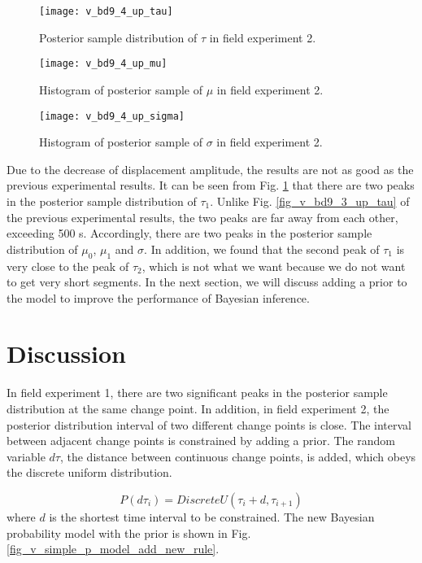 \documentclass[journal]{IEEEtran}
\begin{document}
\begin{figure}[htbp]
	\centering
	\texttt{[image: v\_bd9\_4\_up\_tau]}
	\caption{Posterior sample distribution of $\tau$ in field experiment 2.}
	\label{fig_v_bd9_4_up_tau}
\end{figure} 
\begin{figure}[htbp]
	\centering
	\texttt{[image: v\_bd9\_4\_up\_mu]}
	\caption{Histogram of posterior sample of $\mu$ in field experiment 2.}
	\label{fig_v_bd9_4_up_mu}
\end{figure} 
\begin{figure}[htbp]
	\centering
	\texttt{[image: v\_bd9\_4\_up\_sigma]}
	\caption{Histogram of posterior sample of $\sigma$ in field experiment 2.}
	\label{fig_v_bd9_4_up_sigma}
\end{figure}
Due to the decrease of displacement amplitude, the results are not as good as the previous experimental results. 
It can be seen from Fig. \ref{fig_v_bd9_4_up_tau} that there are two peaks in the posterior sample distribution of $\tau_1$. Unlike Fig. \ref{fig_v_bd9_3_up_tau} of the previous experimental results, the two peaks are far away from each other, exceeding 500 s. 
Accordingly, there are two peaks in the posterior sample distribution of $\mu_0$, $\mu_1$ and $\sigma$. 
In addition, we found that the second peak of $\tau_1$ is very close to the peak of $\tau_2$, which is not what we want because we do not want to get very short segments. 
In the next section, we will discuss adding a prior to the model to improve the performance of Bayesian inference.
\section{Discussion}
\label{disc}
In field experiment 1, there are two significant peaks in the posterior sample distribution at the same change point. 
In addition, in field experiment 2, the posterior distribution interval of two different change points is close.
The interval between adjacent change points is constrained by adding a prior. 
The random variable $d\tau$, the distance between continuous change points, is added, which obeys the  discrete uniform distribution.

\begin{equation}\label{eq_bayesian_prior_d_tau}
P(d\tau_{i})=DiscreteU(\tau_{i} + d,\tau_{i+1})
\end{equation}
where $d$ is the shortest time interval to be constrained. The new Bayesian probability model with the prior is shown in Fig. \ref{fig_v_simple_p_model_add_new_rule}.
\end{document}

